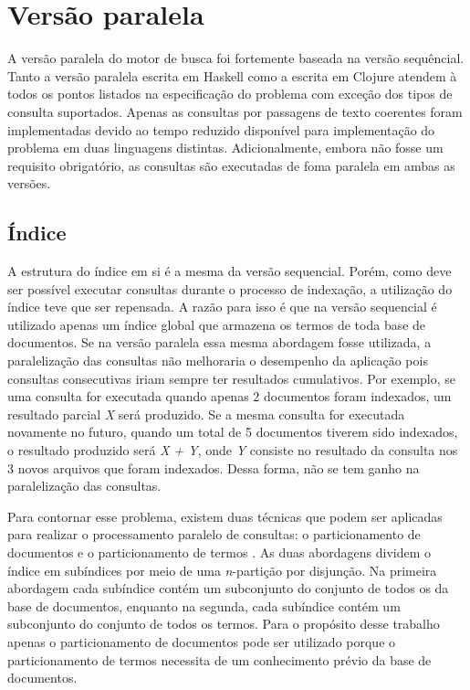\section{Versão paralela}

A versão paralela do motor de busca foi fortemente baseada na versão sequêncial. Tanto a versão paralela escrita em Haskell como a escrita em Clojure atendem à todos os pontos listados na especificação do problema com exceção dos tipos de consulta suportados. Apenas as consultas por passagens de texto coerentes foram implementadas devido ao tempo reduzido disponível para implementação do problema em duas linguagens distintas. Adicionalmente, embora não fosse um requisito obrigatório, as consultas são executadas de foma paralela em ambas as versões.

\subsection{Índice}

A estrutura do índice em si é a mesma da versão sequencial. Porém, como deve ser possível executar consultas durante o processo de indexação, a utilização do índice teve que ser repensada. A razão para isso é que na versão sequencial é utilizado apenas um índice global que armazena os termos de toda base de documentos. Se na versão paralela essa mesma abordagem fosse utilizada, a paralelização das consultas não melhoraria o desempenho da aplicação pois consultas consecutivas iriam sempre ter resultados cumulativos. Por exemplo, se uma consulta for executada quando apenas 2 documentos foram indexados, um resultado parcial \emph{X} será produzido. Se a mesma consulta for executada novamente no futuro, quando um total de 5 documentos tiverem sido indexados, o resultado produzido será \emph{X + Y}, onde \emph{Y} consiste no resultado da consulta nos 3 novos arquivos que foram indexados. Dessa forma, não se tem ganho na paralelização das consultas.

Para contornar esse problema, existem duas técnicas que podem ser aplicadas para realizar o processamento paralelo de consultas: o particionamento de documentos e o particionamento de termos \cite{buttcher2010information}. As duas abordagens dividem o índice em subíndices por meio de uma \emph{n}-partição por disjunção. Na primeira abordagem cada subíndice contém um subconjunto do conjunto de todos os da base de documentos, enquanto na segunda, cada subíndice contém um subconjunto do conjunto de todos os termos. Para o propósito desse trabalho apenas o particionamento de documentos pode ser utilizado porque o particionamento de termos necessita de um conhecimento prévio da base de documentos.

